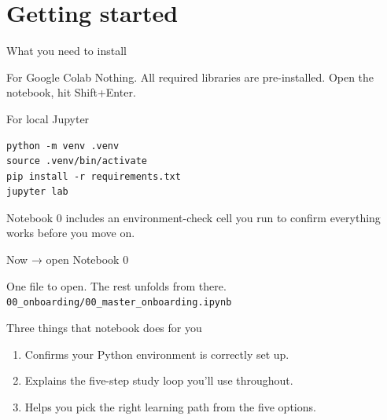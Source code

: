\documentclass[aspectratio=169,11pt]{beamer}
\begin{document}
\section{Getting started}

\begin{frame}[fragile]{What you need to install}
  \begin{block}{For Google Colab}
    Nothing. All required libraries are pre-installed. Open the notebook, hit Shift+Enter.
  \end{block}
  \begin{exampleblock}{For local Jupyter}
\small
\begin{verbatim}
python -m venv .venv
source .venv/bin/activate
pip install -r requirements.txt
jupyter lab
\end{verbatim}
  \end{exampleblock}
  Notebook 0 includes an environment-check cell you run to confirm everything works before you move on.
\end{frame}

\begin{frame}[fragile]{Now → open Notebook 0}
  \vspace{8pt}
  \begin{center}
    {\large One file to open. The rest unfolds from there.}\\[14pt]
    \texttt{\large 00\_onboarding/00\_master\_onboarding.ipynb}\\[18pt]
  \end{center}
  \begin{block}{Three things that notebook does for you}
    \begin{enumerate}
      \item Confirms your Python environment is correctly set up.
      \item Explains the five-step study loop you'll use throughout.
      \item Helps you pick the right learning path from the five options.
    \end{enumerate}
  \end{block}
\end{frame}
\end{document}
